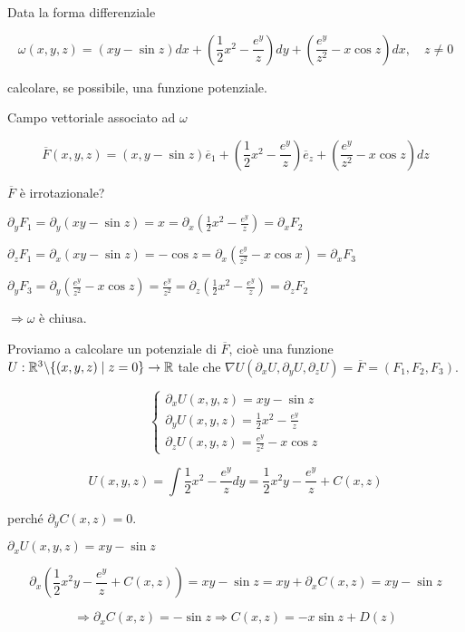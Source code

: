 \begin{exbar}
\begin{example}
	Data la forma differenziale 
	
	$$\omega(x,y,z)=(xy-\sin z)dx +\left(\frac{1}{2}x^2-\frac{e^y}{z} \right)dy+\left( \frac{e^y}{z^2}-x\cos z \right)dx, \quad z \neq 0$$
	
	calcolare, se possibile, una funzione potenziale.
	
	Campo vettoriale associato ad $\omega$
	
	$$\overline{F}(x,y,z)=(x,y-\sin z)\overline{e}_1+\left( \frac{1}{2}x^2-\frac{e^y}{z} \right) \overline{e}_z+\left( \frac{e^y}{z^2}-x\cos z \right)dz$$
	
	$\overline{F}$ è irrotazionale?
	
	$\partial_yF_1=\partial_y(xy-\sin z)=x=\partial_x\left( \frac{1}{2}x^2-\frac{e^y}{z} \right)= \partial_xF_2$
	
	$\partial_z F_1 =\partial_x (xy-\sin z)= -\cos z = \partial_x\left( \frac{e^y}{z^2}-x\cos x \right)=\partial_x F_3$
	
	$\partial_yF_3=\partial_y\left( \frac{e^y}{z^2}-x\cos z \right)= \frac{e^y}{z^2}=\partial_z\left( \frac{1}{2}x^2-\frac{e^y}{z} \right)=\partial_zF_2$
	
	{\centering$\Rightarrow \omega$ è chiusa. \par}
	
	Proviamo a calcolare un potenziale di $\overline{F}$, cioè una funzione $U:\mathbb{R}^3\backslash \{(x,y,z)\mid z=0\}\rightarrow \mathbb{R}$ tale che $\nabla U(\partial_xU,\partial_yU,\partial_zU)=\overline{F}=(F_1,F_2,F_3)$.
	
	$$\begin{cases}
		\partial_xU(x,y,z)=xy-\sin z\\
		\partial_y U(x,y,z)=\frac{1}{2}x^2-\frac{e^y}{z}\\
		\partial_z U(x,y,z)=\frac{e^y}{z^2}-x\cos z
	\end{cases}$$
	
	$$U(x,y,z)=\int \frac{1}{2} x^2 -\frac{e^y}{z}dy=\frac{1}{2}x^2y-\frac{e^y}{z}+C(x,z)$$
	
	perché $\partial_y C(x,z)=0$.
	
	$\partial_xU(x,y,z)=xy-\sin z$
	
	$$\partial_x\left( \frac{1}{2}x^2y-\frac{e^y}{z}+C(x,z) \right) =xy-\sin z =xy+\partial_xC(x,z)=xy-\sin z $$ 
	
	$$\Rightarrow \partial_xC(x,z)=-\sin z \Rightarrow C(x,z)=-x\sin z + D(z)$$
	

\end{example}
\end{exbar}
